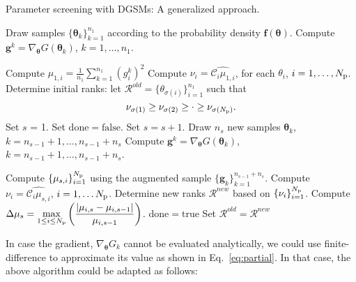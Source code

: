 \clearpage
\begin{breakablealgorithm}
  \caption{Parameter screening with DGSMs: A generalized approach.}
  \begin{algorithmic}[1]
      \State Draw samples $\{ \bm{\theta}_k \}_{k = 1}^{n_1}$ 
       according to the probability density $\bm{f(\theta)}$.
      \State Compute $\bm{g}^k = \nabla_{\bm{\theta}}G(\bm\theta_k)$, 
             $k = 1, \ldots, n_1$. 

      \State Compute 
      $\mu_{1, i} = \frac{1}{n_1} \sum_{k = 1}^{n_1} (g^k_i)^2$
      \State Compute $\nu_i = \widehat{\mathcal{C}_i\mu_{1,i}}$, for each $\theta_i$, 
             $i = 1, \ldots, {N_\text{p}}$. 
      \State Determine initial ranks: 
            let $\mathcal{R}^{old} = \{ \theta_{\sigma(i)}\}_{i=1}^{n_1}$ such that 
\[
   \nu_{\sigma(1)} \geq \nu_{\sigma(2)} \geq \cdot \geq \nu_{\sigma({N_\text{p}})}. 
\]
      \State Set $s$ = 1.
      \State Set $\mathrm{done} = \mathrm{false}$.
        \State Set $s = s + 1$.
        \State Draw $n_s$ new samples 
                  $\bm{\theta}_k$, $k = n_{s-1} + 1, \ldots, n_{s-1} + n_s$
        \State Compute $\bm{g}^k = \nabla_{\bm{\theta}}G(\bm\theta_k)$,
             $k = n_{s-1}+1, \ldots, n_{s-1}+n_s$.

        \State Compute $\{ \mu_{s,i} \}_{i=1}^{N_\text{p}}$ using the augmented sample 
               $\{\bm{g}_k \}_{k = 1}^{n_{s-1}+n_s}$.
        \State Compute $\nu_i = \widehat{\mathcal{C}_i\mu_{s,i}}$, $i = 1, \ldots {N_\text{p}}$.
        \State Determine new ranks $\mathcal{R}^{new}$ based on $\{\nu_i\}_{i=1}^{N_\text{p}}$. 
        \State Compute $\displaystyle\Delta\mu_s = \max_{1\leq i \leq {N_\text{p}}}
               \left(\frac{|\mu_{i,s} - \mu_{i,s-1}|}{ \mu_{i,s-1}}\right)$.
         \State $\mathrm{done} = \mathrm{true}$
      \Else
          \State Set $\mathcal{R}^{old} = \mathcal{R}^{new}$
      \EndIf
    \EndWhile
    \EndProcedure
  \end{algorithmic}
\end{breakablealgorithm}

\bigskip

In case the gradient, $\nabla_{\bm{\theta}}G_k$ cannot be evaluated analytically, we could use finite-difference
to approximate its value as shown in Eq.~\ref{eq:partial}. In that case, the above algorithm could be adapted as
follows:

